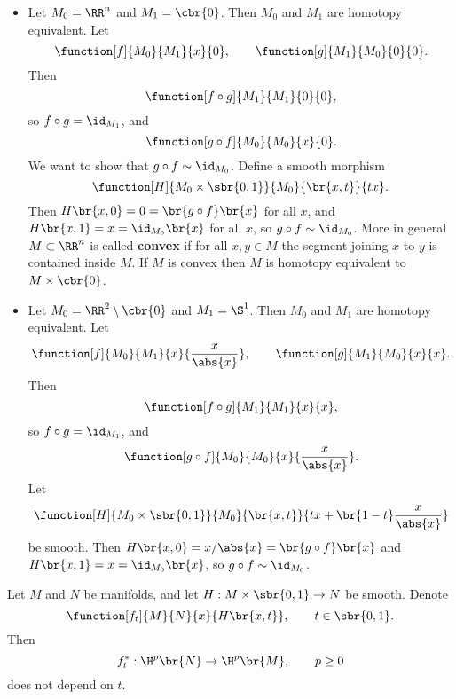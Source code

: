 \begin{example}
\label{eg:2.12}
\hfill
\begin{itemize}
\item Let $ M_0 = \RR^n $ and $ M_1 = \cbr{0} $. Then $ M_0 $ and $ M_1 $ are homotopy equivalent. Let
$$ \function[f]{M_0}{M_1}{x}{0}, \qquad \function[g]{M_1}{M_0}{0}{0}. $$
Then
$$ \function[f \circ g]{M_1}{M_1}{0}{0}, $$
so $ f \circ g = \id_{M_1} $, and
$$ \function[g \circ f]{M_0}{M_0}{x}{0}. $$
We want to show that $ g \circ f \sim \id_{M_0} $. Define a smooth morphism
$$ \function[H]{M_0 \times \sbr{0, 1}}{M_0}{\br{x, t}}{tx}. $$
Then $ H\br{x, 0} = 0 = \br{g \circ f}\br{x} $ for all $ x $, and $ H\br{x, 1} = x = \id_{M_0}\br{x} $ for all $ x $, so $ g \circ f \sim \id_{M_0} $. More in general $ M \subset \RR^n $ is called \textbf{convex} if for all $ x, y \in M $ the segment joining $ x $ to $ y $ is contained inside $ M $. If $ M $ is convex then $ M $ is homotopy equivalent to $ M \times \cbr{0} $.

\pagebreak

\item Let $ M_0 = \RR^2 \setminus \cbr{0} $ and $ M_1 = \S^1 $. Then $ M_0 $ and $ M_1 $ are homotopy equivalent. Let
$$ \function[f]{M_0}{M_1}{x}{\dfrac{x}{\abs{x}}}, \qquad \function[g]{M_1}{M_0}{x}{x}. $$
Then
$$ \function[f \circ g]{M_1}{M_1}{x}{x}, $$
so $ f \circ g = \id_{M_1} $, and
$$ \function[g \circ f]{M_0}{M_0}{x}{\dfrac{x}{\abs{x}}}. $$
Let
$$ \function[H]{M_0 \times \sbr{0, 1}}{M_0}{\br{x, t}}{tx + \br{1 - t}\dfrac{x}{\abs{x}}} $$
be smooth. Then $ H\br{x, 0} = x / \abs{x} = \br{g \circ f}\br{x} $ and $ H\br{x, 1} = x = \id_{M_0}\br{x} $, so $ g \circ f \sim \id_{M_0} $.
\end{itemize}
\end{example}

\begin{proposition}
\label{prop:2.13}
Let $ M $ and $ N $ be manifolds, and let $ H : M \times \sbr{0, 1} \to N $ be smooth. Denote
$$ \function[f_t]{M}{N}{x}{H\br{x, t}}, \qquad t \in \sbr{0, 1}. $$
Then
$$ f_t^* : \H^p\br{N} \to \H^p\br{M}, \qquad p \ge 0 $$
does not depend on $ t $.
\end{proposition}

